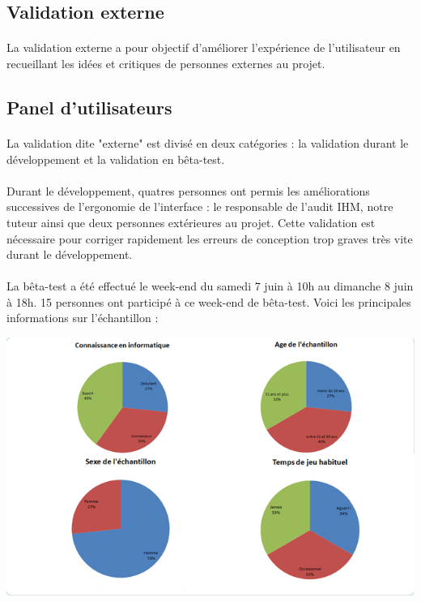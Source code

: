 \documentclass[11pt]{article} %
\begin{document}
\begin{sffamily}
\section{Validation externe}
\paragraph{}
La validation externe a pour objectif d'améliorer l’expérience de l'utilisateur en recueillant les idées et critiques de personnes externes au projet.

\subsection{Panel d'utilisateurs}
\paragraph{}
La validation dite "externe" est divisé en deux catégories : la validation durant le développement et la validation en bêta-test. 
\paragraph{}
Durant le développement, quatres personnes ont permis les améliorations successives de l'ergonomie de l'interface : le responsable de l'audit IHM, notre tuteur ainsi que deux personnes extérieures au projet. Cette validation est nécessaire pour corriger rapidement les erreurs de conception trop graves très vite durant le développement.
\paragraph{}
La bêta-test a été effectué le week-end du samedi 7 juin à 10h au dimanche 8 juin à 18h. 15 personnes ont participé à ce week-end de bêta-test. Voici les principales informations sur l'échantillon :

\begin{center}
\includegraphics[width=15cm]{echantillon.jpg}
\end{center}


\end{sffamily}
\end{document}
